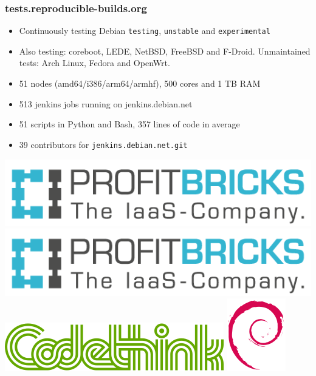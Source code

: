 \documentclass[14pt,aspectratio=169]{beamer}
\begin{document}
\begin{frame}
 \frametitle{tests.reproducible-builds.org}

 \begin{itemize}
  \item Continuously testing Debian \texttt{testing}, \texttt{unstable} and
  \texttt{experimental} 
  \item Also testing: coreboot, LEDE, NetBSD, FreeBSD and F-Droid.
  Unmaintained tests: Arch Linux, Fedora and OpenWrt.
  \item 51 nodes (amd64/i386/arm64/armhf), 500 cores and 1 TB RAM
  \item 513 jenkins jobs running on jenkins.debian.net
  \item 51 scripts in Python and Bash, 357 lines of code in average
  \item 39 contributors for \texttt{jenkins.debian.net.git}
 \end{itemize}
 \begin{center}
  \includegraphics[height=0.1\paperheight]{images/profitbricks_logo.png}
  \hspace{0.1\paperwidth}
  \includegraphics[height=0.1\paperheight]{images/profitbricks_logo.png}
  \hspace{0.1\paperwidth}
  \includegraphics[height=0.1\paperheight]{images/codethink.png}
  \hspace{0.1\paperwidth}
 \includegraphics[height=0.1\paperheight]{images/debian_logo.png}
  \hspace{0.1\paperwidth}
 \end{center}
\end{frame}
\end{document}
